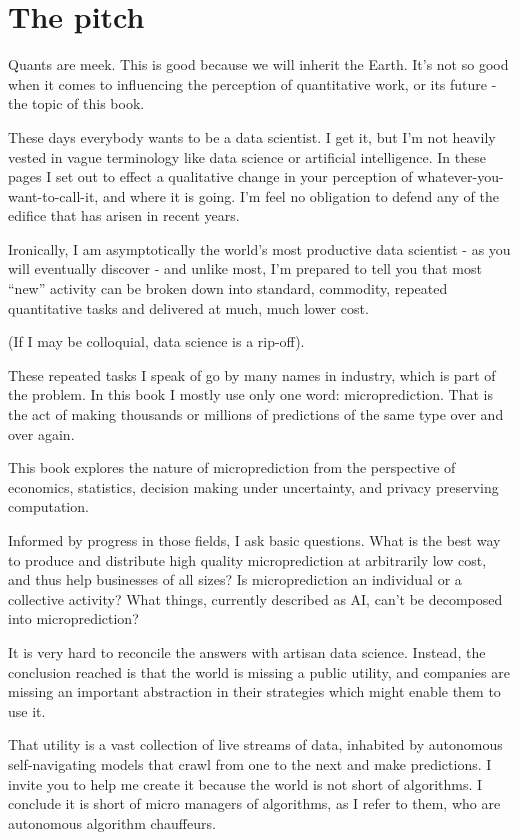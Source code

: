 
\chapter*{The pitch}

Quants are meek. This is good because we will inherit the Earth. It's not so good when it comes to influencing the perception of quantitative work, or its future - the topic of this book.  

These days everybody wants to be a data scientist. I get it, but I'm not heavily vested in vague terminology like data science or artificial intelligence. In these pages I set out to effect a qualitative change in your perception of whatever-you-want-to-call-it, and where it is going. I'm feel no obligation to defend any of the edifice that has arisen in recent years.  

Ironically, I am asymptotically the world's most productive data scientist - as you will eventually discover - and unlike most, I'm prepared to tell you that most ``new'' activity can be broken down into standard, commodity, repeated quantitative tasks and delivered at much, much lower cost. 

(If I may be colloquial, data science is a rip-off). 

These repeated tasks I speak of go by many names in industry, which is part of the problem. In this book I mostly use only one word: microprediction. That is the act of making thousands or millions of predictions of the same type over and over again. 


This book explores the nature of microprediction from the perspective of economics, statistics, decision making under uncertainty, and privacy preserving computation. 

Informed by progress in those fields, I ask basic questions. What is the best way to produce and distribute high quality microprediction at arbitrarily low cost, and thus help businesses of all sizes? Is microprediction an individual or a collective activity?  What things, currently described as AI, can't be decomposed into microprediction?

It is very hard to reconcile the answers with artisan data science. Instead, the conclusion reached is that the world is missing a public utility, and companies are missing an important abstraction in their strategies which might enable them to use it.  

That utility is a vast collection of live streams of data, inhabited by autonomous self-navigating models that crawl from one to the next and make predictions. I invite you to help me create it because the world is not short of algorithms. I conclude it is short of micro managers of algorithms, as I refer to them, who are autonomous algorithm chauffeurs.

